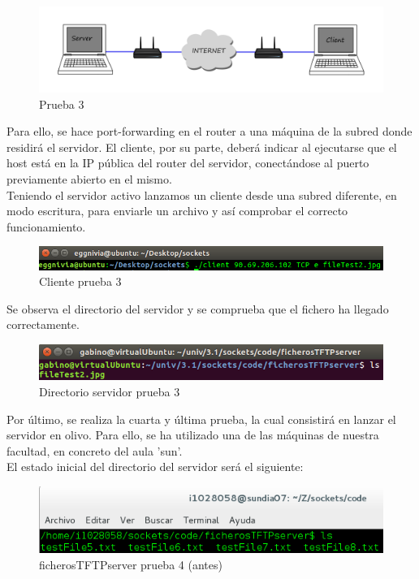 \documentclass[journal, a4paper]{IEEEtran}
\begin{document}
\begin{figure}[H]
\centering
\includegraphics[scale=0.13]{images/cloud}
\caption{Prueba 3}
\end{figure}

Para ello, se hace port-forwarding en el router a una máquina de la subred donde residirá el servidor. El cliente, por su parte, deberá indicar al ejecutarse que el host está en la IP pública del router del servidor, conectándose al puerto previamente abierto en el mismo.\\

Teniendo el servidor activo lanzamos un cliente desde una subred diferente, en modo escritura, para enviarle un archivo y así comprobar el correcto funcionamiento.

\begin{figure}[H]
\centering
\includegraphics[scale=0.45]{images/client_after_3}
\caption{Cliente prueba 3}
\end{figure}

Se observa el directorio del servidor y se comprueba que el fichero ha llegado correctamente.

\begin{figure}[H]
\centering
\includegraphics[scale=0.55]{images/im1}
\caption{Directorio servidor prueba 3}
\end{figure}

Por último, se realiza la cuarta y última prueba, la cual consistirá en lanzar el servidor en olivo. Para ello, se ha utilizado una de las máquinas de nuestra facultad, en concreto del aula 'sun'.\\

El estado inicial del directorio del servidor será el siguiente:

\begin{figure}[H]
\centering
\includegraphics[scale=0.45]{images/server_before_4}
\caption{ficherosTFTPserver prueba 4 (antes) }
\end{figure}
\end{document}
